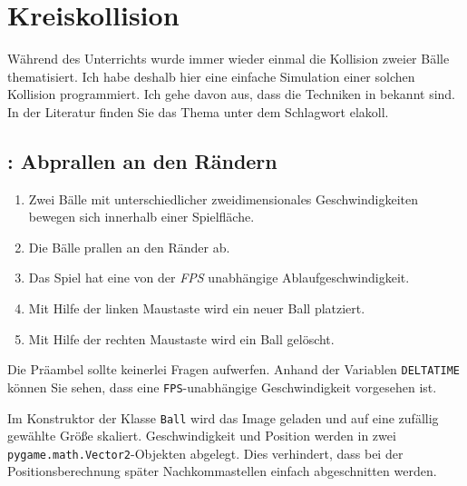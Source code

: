 \section{Kreiskollision}

Während des Unterrichts wurde immer wieder einmal die Kollision zweier Bälle thematisiert. Ich habe deshalb hier eine einfache Simulation einer solchen Kollision programmiert. Ich gehe davon aus, dass die Techniken in  bekannt sind. In der Literatur finden Sie das Thema unter dem Schlagwort \gls{elakoll}.

\subsection{: Abprallen an den Rändern}

\begin{enumerate}
    \item Zwei Bälle mit unterschiedlicher zweidimensionales Geschwindigkeiten bewegen sich innerhalb einer Spielfläche.\label{reqBälle0101}
    \item Die Bälle prallen an den Ränder ab.\label{reqBälle0102}
    \item Das Spiel hat eine von der \emph{FPS} unabhängige Ablaufgeschwindigkeit.\label{reqBälle0103}
    \item Mit Hilfe der linken Maustaste wird ein neuer Ball platziert.\label{reqBälle0104}
    \item Mit Hilfe der rechten Maustaste wird ein Ball gelöscht.\label{reqBälle0105}
\end{enumerate}
\er

Die Präambel sollte keinerlei Fragen aufwerfen. Anhand der Variablen \texttt{DELTATIME} können Sie sehen, dass eine \texttt{FPS}-unabhängige Geschwindigkeit vorgesehen ist.  


Im Konstruktor der Klasse \texttt{Ball} wird das Image geladen und auf eine zufällig gewählte Größe skaliert. Geschwindigkeit und Position werden in zwei \texttt{pygame.math.Vector2}-Objekten abgelegt. Dies verhindert, dass bei der Positionsberechnung später Nachkommastellen einfach abgeschnitten werden. 

